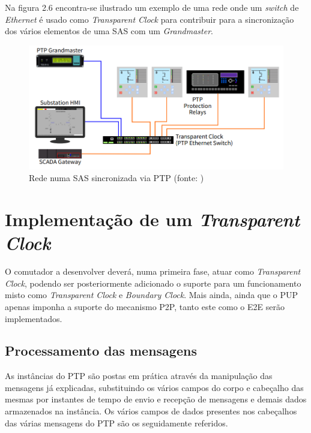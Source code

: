 \par Na figura 2.6 encontra-se ilustrado um exemplo de uma rede onde um \textit{switch} de \textit{Ethernet} é usado como \textit{Transparent Clock} para contribuir para a sincronização dos vários elementos de uma SAS com um \textit{Grandmaster}.

\begin{figure}[H]
  \centering
  \includegraphics[width=1\textwidth]{topology.png}
  \caption[Rede numa SAS sincronizada via PTP ]{Rede numa SAS sincronizada via PTP (fonte: \cite{Electrical})}
  \label{fig:airbus1}
\end{figure}

\fi

\section{Implementação de um \textit{Transparent Clock}}

O comutador a desenvolver deverá, numa primeira fase, atuar como \textit{Transparent Clock}, podendo ser posteriormente adicionado o suporte para um funcionamento misto como \textit{Transparent Clock} e \textit{Boundary Clock}. Mais ainda, ainda que o PUP apenas imponha a suporte do mecanismo P2P, tanto este como o E2E serão implementados. 

\subsection{Processamento das mensagens}

As instâncias do PTP são postas em prática através da manipulação das mensagens já explicadas, substituindo os vários campos do corpo e cabeçalho das mesmas por instantes de tempo de envio e recepção de mensagens e demais dados armazenados na instância. Os vários campos de dados presentes nos cabeçalhos das várias mensagens do PTP são os seguidamente referidos.  

